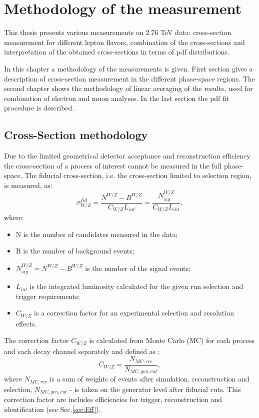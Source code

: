 \chapter{Methodology of the measurement}\label{chap:Met}
\minitoc

This thesis presents various measurements on 2.76 TeV data: cross-section measurement for different lepton flavors, combination of the cross-sections and interpretation of the obtained cross-sections in terms of pdf distributions.

 In this chapter a methodology of the measurements is given. First section gives a description of cross-section measurement in the different phase-space regions. The second chapter shows the methodology of linear averaging of the results, used for combination of electron and muon analyses. In the last section the pdf fit procedure is described.
 
\section{Cross-Section methodology}
Due to the limited geometrical detector acceptance and reconstruction efficiency the cross-section of a process of interest cannot be measured in the full phase-space. The fiducial cross-section, i.e. the cross-section limited to selection region, is measured, as:
\begin{equation}
\sigma^{fid}_{W/Z} = \frac{N^{W/Z}-B^{W/Z}}{C_{W/Z}L_{int}}=\frac{N^{W/Z}_{sig}}{C_{W/Z}L_{int}},
\end{equation}
where:
\begin{itemize}
\item N is the number of candidates measured in the data;
\item B is the number of background events;
\item $N^{W/Z}_{sig}=N^{W/Z}-B^{W/Z}$ is the number of the signal events;
\item $L_{int}$ is the integrated luminosity calculated for the given run selection and trigger requirements;
\item $C_{W/Z}$ is a correction factor for an experimental selection and resolution effects.
\end{itemize}

The correction factor $C_{W/Z}$ is calculated from Monte Carlo (MC) for each process and each decay channel separately and defined as :
\begin{equation}
C_{W/Z}=\frac{N_{MC, rec}}{N_{MC,gen, cut}}, 
\end{equation}
where $N_{MC, rec}$ is a sum of weights of events after simulation, reconstruction and selection, $N_{MC,gen, cut}$ - is taken on the generator level after fiducial cuts. This correction factor are includes efficiencies for trigger, reconstruction and identification (see Sec.\ref{sec:Eff}).

